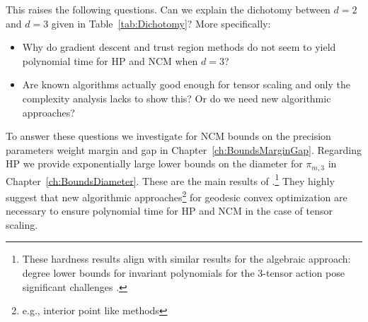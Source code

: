 This raises the following questions. Can we explain the dichotomy between $d=2$ and $d=3$ given in Table~\ref{tab:Dichotomy}? More specifically:
\begin{itemize}
	\item Why do gradient descent and trust region methods do not seem to yield polynomial time for HP and NCM when $d=3$?
	
	\item Are known algorithms actually good enough for tensor scaling and only the complexity analysis lacks to show this? Or do we need new algorithmic approaches?
\end{itemize}

To answer these questions we investigate for NCM bounds on the precision parameters weight margin and gap in Chapter~\ref{ch:BoundsMarginGap}. Regarding HP we provide exponentially large lower bounds on the diameter for $\pi_{m,3}$ in Chapter~\ref{ch:BoundsDiameter}. These are the main results of \cite{WeightMargin}.\footnote{These hardness results align with similar results for the algebraic approach: degree lower bounds for invariant polynomials for the $3$-tensor action pose significant challenges \cite{derksen2020exponential}.}
They highly suggest that new algorithmic approaches\footnote{e.g., interior point like methods} for geodesic convex optimization are necessary to ensure polynomial time for HP and NCM in the case of tensor scaling.




























